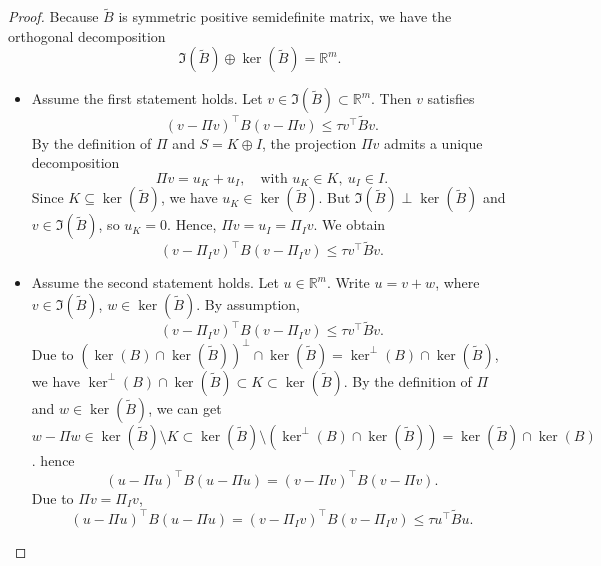 \documentclass{article}
\theoremstyle{definition}
\theoremstyle{remark}
\begin{document}
\begin{proof}
    Because \(\tilde{B}\) is symmetric positive semidefinite matrix, we have the orthogonal decomposition
    \[\Im(\tilde B) \oplus \ker(\tilde B) =   \mathbb{R}^{m}.\]
    \begin{itemize}
        \item [\((\Rightarrow)\)] Assume the first statement holds.
        Let \( v \in \Im(\tilde B) \subset \mathbb{R}^{m} \). Then \( v \) satisfies
        \[
        (v - \Pi v)^\top B (v - \Pi v) \leq \tau v^\top \tilde B v.
        \]
       By the definition of \( \Pi \) and \( S = K \oplus I \), the projection \( \Pi v \) admits a unique decomposition
       \[
       \Pi v = u_K + u_I, \quad \text{with } u_K \in K,\ u_I \in I.
       \]
       Since \( K \subseteq \ker(\tilde B) \), we have \( u_K \in \ker(\tilde B) \). But \( \Im(\tilde B) \perp \ker(\tilde B) \) and $v \in \Im(\tilde B)$, so \( u_K = 0 \). Hence, \( \Pi v = u_I = \Pi_I v\). We obtain
       \[
       (v - \Pi_I v)^\top B (v - \Pi_I v) \leq \tau v^\top \tilde B v.
       \]  
        \item[\((\Leftarrow)\)] Assume the second statement holds. Let \( u \in \mathbb{R}^{m} \). Write \( u = v + w \), where \( v \in \Im(\tilde B) \), \( w \in \ker(\tilde B) \). By assumption,
        \[
        (v - \Pi_I v)^\top B (v - \Pi_I v) \leq \tau v^\top \tilde B v.
        \]
        Due to \((\ker(B)\cap \ker(\tilde B))^{\perp} \cap \ker(\tilde B) = \ker^{\perp}(B)\cap\ker(\tilde B)\), we have \(\ker^{\perp}(B)\cap\ker(\tilde B) \subset K \subset \ker(\tilde B)\). By the definition of \( \Pi \) and $w \in \ker(\tilde B)$, we can get \(w - \Pi w \in \ker(\tilde B) \setminus K \subset \ker(\tilde B) \setminus (\ker^{\perp}(B)\cap\ker(\tilde B)) = \ker(\tilde B) \cap \ker(B)\). hence
        \[
        (u - \Pi u)^\top B (u - \Pi u) = (v - \Pi v)^\top B (v - \Pi v).
        \]
        Due to \(\Pi v = \Pi_I v\), 
        \[
        (u - \Pi u)^\top B (u - \Pi u) = (v - \Pi_I v)^\top B (v - \Pi_I v) \leq \tau u^\top \tilde B u.
        \]
    \end{itemize}
\end{proof}
\end{document}
